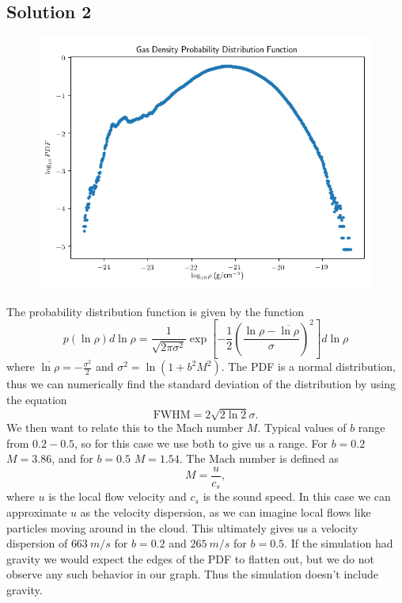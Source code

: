 \documentclass[11pt]{article}
\newenvironment{tight_enumerate}{
\begin{enumerate}[label=(\alph*)]
\setlength{\itemsep}{3pt}
\setlength{\parskip}{0pt}
}{\end{enumerate}}
\begin{document}
\subsection*{Solution 2}
\begin{tight_enumerate}
\item \leavevmode
\begin{figure}[H]
\vspace{-1em}
\centering
\includegraphics[height=0.4\textheight]{2/pdf.png}
\vspace{-1.5em}
\end{figure}
The probability distribution function is given by the function
\[p(\ln\rho)d\ln\rho = \frac{1}{\sqrt{2\pi\sigma^{2}}}\exp\left[-\frac{1}{2}\left(\frac{\ln\rho-\overline{\ln\rho}}{\sigma}\right)^{2}\right]d\ln\rho\]
where $\overline{\ln\rho} = -\frac{\sigma^{2}}{2}$ and $\sigma^{2} = \ln(1+b^{2}M^{2})$. The PDF is a normal distribution, thus we can numerically find the standard deviation of the distribution by using the equation 
\[\text{FWHM} = 2\sqrt{2\ln2}\sigma.\]
We then want to relate this to the Mach number $M$. Typical values of $b$ range from $0.2-0.5$, so for this case we use both to give us a range. For $b = 0.2$ $M = 3.86$, and for $b = 0.5$ $M = 1.54$. The Mach number is defined as 
\[M = \frac{u}{c_{s}},\]
where $u$ is the local flow velocity and $c_{s}$ is the sound speed. In this case we can approximate $u$ as the velocity dispersion, as we can imagine local flows like particles moving around in the cloud. This ultimately gives us a velocity dispersion of $663\ \si{m/s}$ for $b = 0.2$ and $265\ \si{m/s}$ for $b = 0.5$. 
If the simulation had gravity we would expect the edges of the PDF to flatten out, but we do not observe any such behavior in our graph. Thus the simulation doesn't include gravity.

\end{tight_enumerate}
\end{document}
